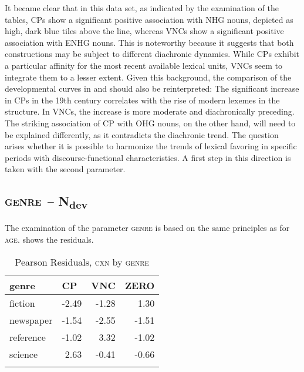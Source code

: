 \documentclass[output=paper,colorlinks,citecolor=brown]{langscibook}
\begin{document}
It became clear that in this data set, as indicated by the examination of the tables, CPs show a significant positive association with NHG nouns, depicted as high, dark blue tiles above the line, whereas VNCs show a significant positive association with ENHG nouns. This is noteworthy because it suggests that both constructions may be subject to different diachronic dynamics. While CPs exhibit a particular affinity for the most recent available lexical units, VNCs seem to integrate them to a lesser extent. Given this background, the comparison of the developmental curves in  and  should also be reinterpreted: The significant increase in CPs in the 19th century correlates with the rise of modern lexemes in the structure. In VNCs, the increase is more moderate and diachronically preceding. The striking association of CP with OHG nouns, on the other hand, will need to be explained differently, as it contradicts the diachronic trend. The question arises whether it is possible to harmonize the trends of lexical favoring in specific periods with discourse-functional characteristics. A first step in this direction is taken with the second parameter.


\subsection{\textsc{genre} \textit{–} N\textsubscript{dev}}\label{sec:fleissner:4.2}
The examination of the parameter \textsc{genre} is based on the same principles as for \textsc{age}.   shows the residuals.

\begin{table}[t]
\begin{tabularx}{0.5\textwidth}{lrrr}
\lsptoprule
{{genre}} &  \multicolumn{1}{l}{CP} &  \multicolumn{1}{l}{{VNC}} &  \multicolumn{1}{l}{{ZERO}}\\
\midrule
{{fiction}} & {{}-2.49} & {{}-1.28} & {1.30}\\
{{newspaper}} & {{}-1.54} & {{}-2.55} & {{}-1.51}\\
{{reference}} & {{}-1.02} & {3.32} & {{}-1.02}\\
{{science}} & {2.63} & {{}-0.41} & {{}-0.66}\\
\lspbottomrule
\end{tabularx}
\caption{Pearson Residuals, \textsc{cxn} \textup{by} \textsc{genre}}
\label{tab:fleissner:6}
\end{table}
\end{document}
